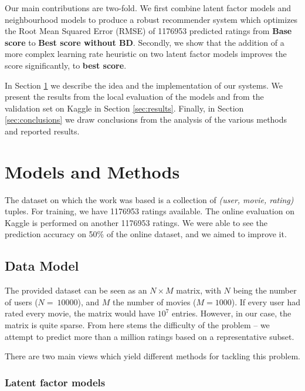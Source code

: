 \documentclass[10pt,conference,compsocconf]{IEEEtran}
\begin{document}
	Our main contributions are two-fold. We first combine latent factor models and neighbourhood models to produce a robust recommender system which optimizes the Root Mean Squared Error (RMSE) of 1176953 predicted ratings from \textbf{Base score} to \textbf{Best score without BD}. Secondly, we show that the addition of a more complex learning rate heuristic on two latent factor models improves the score significantly, to \textbf{best score}. 
	
	In Section \ref{sec:models} we describe the idea and the implementation of our systems. We present the results from the local evaluation of the models and from the validation set on Kaggle in Section \ref{sec:results}. Finally, in Section \ref{sec:conclusions} we draw conclusions from the analysis of the various methods and reported results.
	
	
	\section{Models and Methods}
	\label{sec:models}
	The dataset on which the work was based is a collection of \emph{(user, movie, rating)} tuples. For training, we have 1176953 ratings available. The online evaluation on Kaggle is performed on another 1176953 ratings. We were able to see the prediction accuracy on 50\% of the online dataset, and we aimed to improve it.
	\subsection{Data Model}
	
	The provided dataset can be seen as an $N\times M$ matrix, with $N$ being the number of users ($N=~10000$), and $M$ the number of movies ($M=1000$). If every user had rated every movie, the matrix would have $10^7$ entries. However, in our case, the matrix is quite sparse. From here stems the difficulty of the problem -- we attempt to predict more than a million ratings based on a representative subset. 
	
	There are two main views which yield different methods for tackling this problem.
	
	\subsubsection*{\textbf{Latent factor models}} 
	
	
\end{document}
